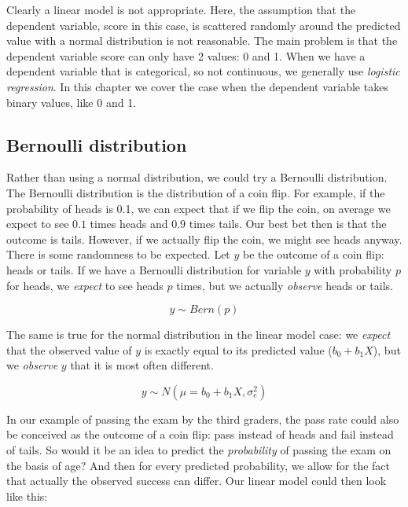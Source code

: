 \documentclass[]{book}\usepackage[]{graphicx}\usepackage[]{color}
\begin{document}
Clearly a linear model is not appropriate. Here, the assumption that the dependent variable, score in this case, is scattered randomly around the predicted value with a normal distribution is not reasonable. The main problem is that the dependent variable score can only have 2 values: 0 and 1. When we have a dependent variable that is categorical, so not continuous, we generally use \textit{logistic regression}. In this chapter we cover the case when the dependent variable takes binary values, like 0 and 1.


\subsection{Bernoulli distribution}

Rather than using a normal distribution, we could try a Bernoulli distribution. The Bernoulli distribution is the distribution of a coin flip. For example, if the probability of heads is 0.1, we can expect that if we flip the coin, on average we expect to see $0.1$ times heads and 0.9 times tails. Our best bet then is that the outcome is tails. However, if we actually flip the coin, we might see heads anyway. There is some randomness to be expected. Let $y$ be the outcome of a coin flip: heads or tails. If we have a Bernoulli distribution for variable $y$ with probability $p$ for heads, we \textit{expect} to see heads $p$ times, but we actually \textit{observe} heads or tails.

\begin{equation}
y \sim Bern(p)
\end{equation}

The same is true for the normal distribution in the linear model case: we \textit{expect} that the observed value of $y$ is exactly equal to its predicted value ($b_0 + b_1 X$), but we \textit{observe} $y$ that it is most often different.

\begin{equation}
y \sim N(\mu= b_0 + b_1 X, \sigma^2_e)
\end{equation}

In our example of passing the exam by the third graders, the pass rate could also be conceived as the outcome of a coin flip: pass instead of heads and fail instead of tails. So would it be an idea to predict the \textit{probability} of passing the exam on the basis of age? And then for every predicted probability, we allow for the fact that actually the observed success can differ. Our linear model could then look like this:
\end{document}
